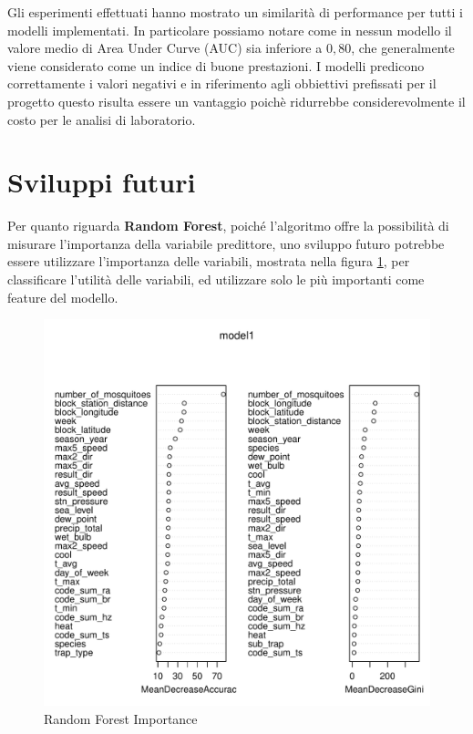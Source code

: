 Gli esperimenti effettuati hanno mostrato un similarità di performance 
per tutti i modelli implementati. In particolare possiamo notare come in 
nessun modello il valore medio di Area Under Curve (AUC) sia inferiore a 
$0,80$, che generalmente viene considerato come un indice di buone prestazioni. 
I modelli predicono correttamente i valori negativi e in riferimento 
agli obbiettivi prefissati per il progetto questo risulta essere un vantaggio 
poichè ridurrebbe considerevolmente il costo per le analisi di laboratorio.

\section{Sviluppi futuri}

Per quanto riguarda \textbf{Random Forest}, poiché l'algoritmo offre la 
possibilità di misurare l’importanza della variabile predittore, uno sviluppo 
futuro potrebbe essere utilizzare l'importanza delle variabili, mostrata nella 
figura \ref{fig:rf_importance}, per classificare l'utilità delle variabili, ed 
utilizzare solo le più importanti come feature del modello. 

\begin{figure}[H]
	\centering
	\includegraphics[width=0.6\columnwidth]{images/ml/random_forest/HoldoutRF/model_importance}
	\caption{Random Forest Importance}
	\label{fig:rf_importance}
\end{figure}

